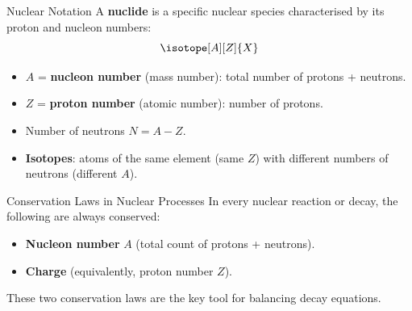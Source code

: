\begin{center}
\end{center}

\begin{definitionbox}{Nuclear Notation}
A \textbf{nuclide} is a specific nuclear species characterised by its proton and nucleon numbers:
$$\isotope[A][Z]{X}$$
\begin{itemize}[itemsep=2pt]
  \item $A$ = \textbf{nucleon number} (mass number): total number of protons + neutrons.
  \item $Z$ = \textbf{proton number} (atomic number): number of protons.
  \item Number of neutrons $N = A - Z$.
  \item \textbf{Isotopes}: atoms of the same element (same $Z$) with different numbers of neutrons (different $A$).
\end{itemize}
\end{definitionbox}

\begin{keybox}{Conservation Laws in Nuclear Processes}
In every nuclear reaction or decay, the following are always conserved:
\begin{itemize}[itemsep=2pt]
  \item \textbf{Nucleon number} $A$ (total count of protons + neutrons).
  \item \textbf{Charge} (equivalently, proton number $Z$).
\end{itemize}
These two conservation laws are the key tool for balancing decay equations.
\end{keybox}

